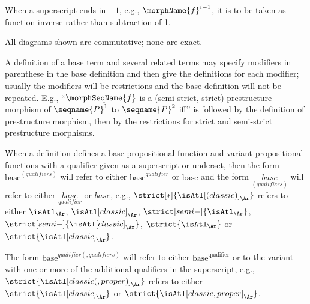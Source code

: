\documentclass{article}
\begin{document}
When a superscript ends in $-1$, e.g., $\morphName{f}^{i-1}$, it is to be
taken as function inverse rather than subtraction of 1.

All diagrams shown are commutative; none are exact.

A definition of a base term and several related terms may specify
modifiers in parenthese in the base definition and then give the
definitions for each modifier; usually the modifiers will be
restrictions and the base definition will not be repeated.  E.g.,
{\textquotedblleft}$\morphSeqName{f}$ is a (semi-strict, strict)
prestructure morphism of $\seqname{P}^1$ to $\seqname{P}^2$
iff{\textquotedblright} is followed by the definition of prestructure
morphism, then by the restrictions for strict and semi-strict
prestructure morphisms.

When a definition defines a base propositional function and variant
propositional functions with a qualifier given as a superscript or
underset, then the form $\mathrm{base}^{(qualifiers)}$ will refer to
either $\mathrm{base}^{qualifier}$ or $\mathrm{base}$ and the form
$\underset{(qualifiers)}{base}$ will refer to either
$\underset{qualifier}{base}$ or $base$, e.g.,
$\strict[*]{\isAtl[(classic)]_\Ar}$ refers to either $\isAtl_\Ar$,
$\isAtl[classic]_\Ar$, $\strict[semi-]{\isAtl_\Ar}$,
$\strict[semi-]{\isAtl[classic]_\Ar}$, $\strict{\isAtl_\Ar}$ or
$\strict{\isAtl[classic]_\Ar}$.

The form $\mathrm{base}^{qualifier(,qualifiers)}$ will refer to either
$\mathrm{base}^{\mathrm{qualifier}}$ or to the variant with one or more
of the additional qualifiers in the superscript, e.g.,
$\strict{\isAtl[classic(,proper)]_\Ar}$ refers to either
$\strict{\isAtl[classic]_\Ar}$ or
$\strict{\isAtl[classic,proper]_\Ar}$.
\end{document}
